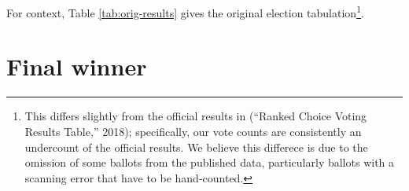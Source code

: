 \documentclass[12pt,twoside]{reedthesis}
\begin{document}
\begin{table}[t]

\caption[Election results - original]{\label{tab:orig-results}Original election results}
\centering
{}
\end{table}
For context, Table \ref{tab:orig-results} gives the original election tabulation\footnote{This differs slightly from the official results in (``Ranked Choice Voting Results Table,'' 2018); specifically, our vote counts are consistently an undercount of the official results. We believe this differece is due to the omission of some ballots from the published data, particularly ballots with a scanning error that have to be hand-counted.}.

\hypertarget{final-winner}{%
\section{Final winner}\label{final-winner}}
\end{document}

